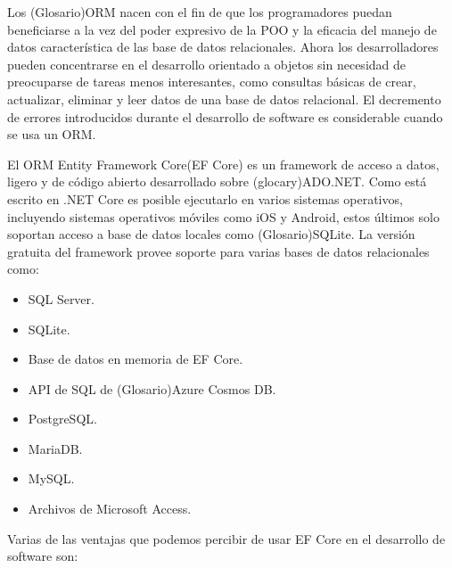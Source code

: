 Los (Glosario)ORM nacen con el fin de que los programadores puedan beneficiarse a la vez del poder expresivo de la POO y la eficacia del manejo de datos característica de las base de datos relacionales. Ahora los desarrolladores pueden concentrarse en el desarrollo orientado a objetos sin necesidad de preocuparse de tareas menos interesantes, como consultas básicas de crear, actualizar, eliminar y leer datos de una base de datos relacional. El decremento de errores  introducidos durante el desarrollo de software es considerable cuando se usa un ORM.
\newline

El ORM Entity Framework Core(EF Core) es un framework de acceso a datos, ligero y de código abierto desarrollado sobre (glocary)ADO.NET. Como está escrito en .NET Core es posible ejecutarlo en varios sistemas operativos, incluyendo sistemas operativos móviles como iOS y Android, estos últimos solo soportan acceso a base de datos locales como (Glosario)SQLite. La versión gratuita del framework provee soporte para varias bases de datos relacionales como:


\begin{itemize}
	\item SQL Server.
    \item SQLite.
    \item Base de datos en memoria de EF Core.
    \item API de SQL de (Glosario)Azure Cosmos DB.
    \item PostgreSQL.
    \item MariaDB.
    \item MySQL.
    \item Archivos de Microsoft Access.
    
\end{itemize}

Varias de las ventajas que podemos percibir de usar EF Core en el desarrollo de software son:

